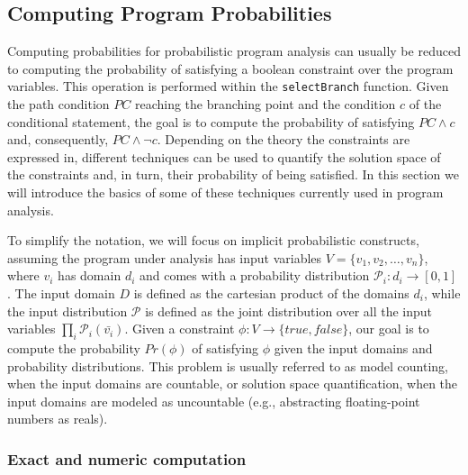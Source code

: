 \subsection{Computing Program Probabilities}
\label{sec:computingprobabilities}

Computing probabilities for probabilistic program analysis can usually be reduced to computing the probability of satisfying a boolean constraint over the program variables. This operation is performed within the {\tt selectBranch} function. Given the path condition $PC$ reaching the branching point and the condition $c$ of the conditional statement, the goal is to compute the probability of satisfying $PC \land c$ and, consequently, $PC \land \neg c$. Depending on the theory the constraints are expressed in, different techniques can be used to quantify the solution space of the constraints and, in turn, their probability of being satisfied. In this section we will introduce the basics of some of these techniques currently used in program analysis. 

To simplify the notation, we will focus on implicit probabilistic constructs, assuming the program under analysis has input variables $V=\{v_1, v_2, \dots, v_n\}$, where $v_i$ has domain $d_i$ and comes with a probability distribution $\mathcal{P}_i: d_i \to [0, 1]$. The input domain $D$ is defined as the cartesian product of the domains $d_i$, while the input distribution $\mathcal{P}$ is defined as the joint distribution over all the input variables $\prod_i \mathcal{P}_i(\bar{v_i})$. Given a constraint $\phi: V \to \{true, false\}$, our goal is to compute the probability $Pr(\phi)$ of satisfying $\phi$ given the input domains and probability distributions. This problem is usually referred to as model counting, when the input domains are countable, or solution space quantification, when the input domains are modeled as uncountable (e.g., abstracting floating-point numbers as reals).

\subsubsection{Exact and numeric computation}\label{sec:computingprobabilitiesExact}

